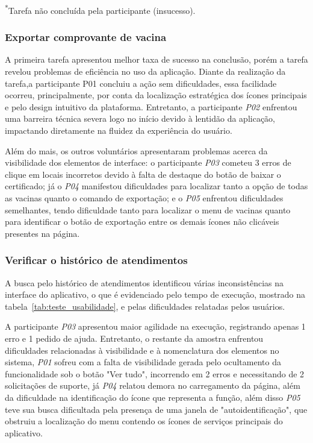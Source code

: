 \documentclass[12pt]{article}
\begin{document}
\begin{abstractp}
\begin{table}[htbp]
\vspace{0.2cm}
\footnotesize{\textsuperscript{*}Tarefa não concluída pela participante (insucesso).}
\end{table}

\subsubsection{Exportar comprovante de vacina}
A primeira tarefa apresentou melhor taxa de sucesso na conclusão, porém a tarefa revelou problemas de eficiência no uso da aplicação. Diante da realização da tarefa,a participante \textit{}{P01} concluiu a ação sem dificuldades, essa facilidade ocorreu, principalmente, por conta da localização estratégica dos ícones principais e pelo design intuitivo da plataforma. Entretanto, a participante \textit{P02} enfrentou uma barreira técnica severa logo no início devido à lentidão da aplicação, impactando diretamente na fluidez da experiência do usuário.

Além do mais, os outros voluntários apresentaram problemas acerca da visibilidade dos elementos de interface: o participante \textit{P03} cometeu 3 erros de clique em locais incorretos devido à falta de destaque do botão de baixar o certificado; já o \textit{P04} manifestou dificuldades para localizar tanto a opção de todas as vacinas quanto o comando de exportação; e o \textit{P05} enfrentou dificuldades semelhantes, tendo dificuldade tanto para localizar o menu de vacinas quanto para identificar o botão de exportação entre os demais ícones não clicáveis presentes na página.

\subsubsection{Verificar o histórico de atendimentos}
A busca pelo histórico de atendimentos identificou várias inconsistências na interface do aplicativo, o que é evidenciado pelo tempo de execução, mostrado na tabela~\ref{tab:teste_usabilidade}, e pelas dificuldades relatadas pelos usuários. 

A participante \textit{P03} apresentou maior agilidade na execução, registrando apenas 1 erro e 1 pedido de ajuda. Entretanto, o restante da amostra enfrentou dificuldades relacionadas à visibilidade e à nomenclatura dos elementos no sistema, \textit{P01} sofreu com a falta de visibilidade gerada pelo ocultamento da funcionalidade sob o botão "Ver tudo", incorrendo em 2 erros e necessitando de 2 solicitações de suporte, já \textit{P04} relatou demora no carregamento da página, além da dificuldade na identificação do ícone que representa a função, além disso \textit{P05} teve sua busca dificultada pela presença de uma janela de "autoidentificação", que obstruiu a localização do menu contendo os ícones de serviços principais do aplicativo.


\end{abstractp}
\end{document}
